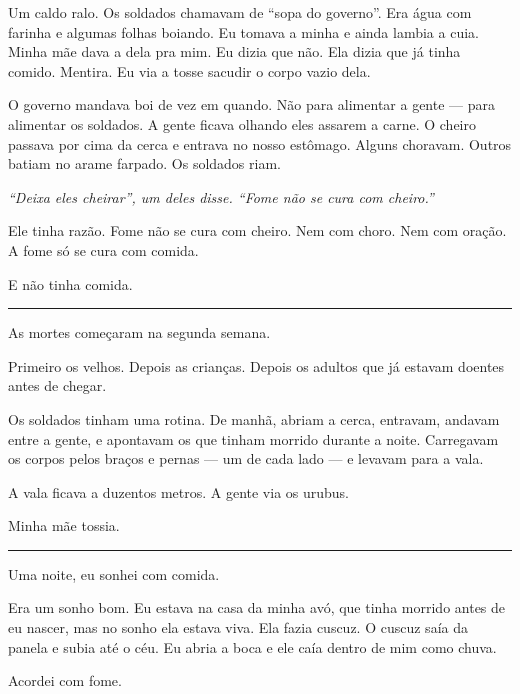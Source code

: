 \noindent Um caldo ralo. Os soldados chamavam de \textquotedblleft{}sopa do governo\textquotedblright{}. Era água com farinha e algumas folhas boiando. Eu tomava a minha e ainda lambia a cuia. Minha mãe dava a dela pra mim. Eu dizia que não. Ela dizia que já tinha comido. Mentira. Eu via a tosse sacudir o corpo vazio dela.

\noindent O governo mandava boi de vez em quando. Não para alimentar a gente --- para alimentar os soldados. A gente ficava olhando eles assarem a carne. O cheiro passava por cima da cerca e entrava no nosso estômago. Alguns choravam. Outros batiam no arame farpado. Os soldados riam.

\noindent \textit{\textquotedblleft{}Deixa eles cheirar\textquotedblright{}\textit{, um deles disse. }\textquotedblleft{}Fome não se cura com cheiro.\textquotedblright{}}

\noindent Ele tinha razão. Fome não se cura com cheiro. Nem com choro. Nem com oração. A fome só se cura com comida.

\noindent E não tinha comida.

\vspace{0.5em}\noindent\rule{\textwidth}{0.5pt}\vspace{0.5em}

\noindent As mortes começaram na segunda semana.

\noindent Primeiro os velhos. Depois as crianças. Depois os adultos que já estavam doentes antes de chegar.

\noindent Os soldados tinham uma rotina. De manhã, abriam a cerca, entravam, andavam entre a gente, e apontavam os que tinham morrido durante a noite. Carregavam os corpos pelos braços e pernas --- um de cada lado --- e levavam para a vala.

\noindent A vala ficava a duzentos metros. A gente via os urubus.

\noindent Minha mãe tossia.

\vspace{0.5em}\noindent\rule{\textwidth}{0.5pt}\vspace{0.5em}

\noindent Uma noite, eu sonhei com comida.

\noindent Era um sonho bom. Eu estava na casa da minha avó, que tinha morrido antes de eu nascer, mas no sonho ela estava viva. Ela fazia cuscuz. O cuscuz saía da panela e subia até o céu. Eu abria a boca e ele caía dentro de mim como chuva.

\noindent Acordei com fome.

